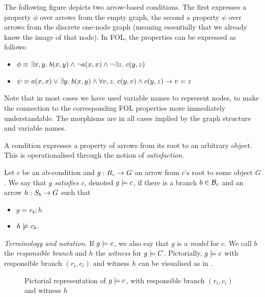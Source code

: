 \begin{example}
The following figure depicts two arrow-based conditions. The first expresses a property $\phi$ over arrows from the empty graph, the second a property $\psi$ over arrows from the discrete one-node graph (meaning essentially that we already know the image of that node). In FOL, the properties can be expressed as follows:
\begin{itemize}
\item $\phi\equiv \exists x,y.\; b(x,y) \wedge \neg a(x,x)\wedge \neg \exists z.\; c(y,z)$
\item $\psi\equiv a(x,x)\vee \exists y.\; b(x,y) \wedge \forall v,z.\; c(y,v)\wedge c(y,z) \rightarrow v=z$
\end{itemize}
Note that in most cases we have used variable names to represent nodes, to make the connection to the corresponding FOL properties more immediately understandable. The morphisms are in all cases implied by the graph structure and variable names.
\begin{center}

\end{center}
\end{example}
%
A condition expresses a property of arrows from its root to an arbitrary object. This is operationalised through the notion of \emph{satisfaction}.

\begin{definition}
  Let $c$ be an ab-condition and $g:R_c\rightarrow G$ an arrow from $c$'s root to some object $G$. We say that \emph{$g$ satisfies $c$}, denoted $g\models c$, if there is a branch $b\in \mathcal{B}_c$ and an arrow $h:S_b\rightarrow G$ such that
  \begin{itemize}
  \item $g=r_b;h$
  \item $h\not\models c_b$.
  \end{itemize}
\end{definition}
%
\emph{Terminology and notation.} If $g\models c$, we also say that $g$ is a \emph{model} for $c$. We call $b$ the \emph{responsible branch} and $h$ the \emph{witness} for $g\models C$. Pictorially, $g\models c$ with responsible branch $(r_i,c_i)$ and witness $h$ can be visualised as in .
%
\begin{figure}
  \centering
  
  \caption{Pictorial representation of $g\models c$, with responsible branch $(r_i,c_i)$ and witness $h$}
\end{figure}

